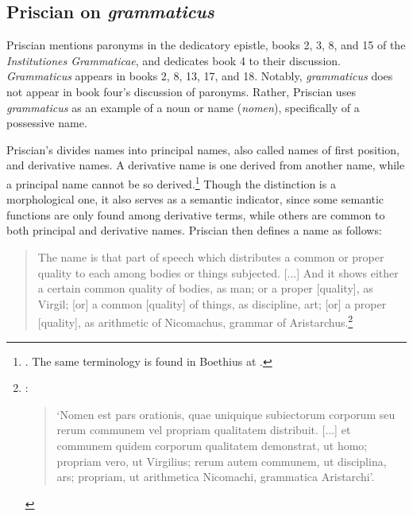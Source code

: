 \documentclass[]{article}
\begin{document}
\subsection{Priscian on \textit{grammaticus}}
Priscian mentions paronyms in the dedicatory epistle, books 2, 3, 8, and 15 of the \textit{Institutiones Grammaticae}, and dedicates book 4 to their discussion. \textit{Grammaticus} appears in books 2, 8, 13, 17, and 18. Notably, \textit{grammaticus} does not appear in book four's discussion of paronyms. Rather, Priscian uses \textit{grammaticus} as an example of a noun or name (\textit{nomen}), specifically of a possessive name.

Priscian's divides names into principal names, also called names of first position, and derivative names. A derivative name is one derived from another name, while a principal name cannot be so derived.\footnote{\cite[\textit{inst. gram.} II, pp. 59-60]{inst.gram.}. The same terminology is found in Boethius at \cite[BC 168A]{BC}.} Though the distinction is a morphological one, it also serves as a semantic indicator, since some semantic functions are only found among derivative terms, while others are common to both principal and derivative names. Priscian then defines a name as follows:
\begin{quote}
The name is that part of speech which distributes a common or proper quality to each among bodies or things subjected. [...] And it shows either a certain common quality of bodies, as man; or a proper [quality], as Virgil; [or] a common [quality] of things, as discipline, art; [or] a proper [quality], as arithmetic of Nicomachus, grammar of Aristarchus.\footnote{\cite[\textit{inst. gram.}, II, pp. 56-57]{inst.gram.}:
\begin{quote}
`Nomen est pars orationis, quae uniquique subiectorum corporum seu rerum communem vel propriam qualitatem distribuit. [...] et communem quidem corporum qualitatem demonstrat, ut homo; propriam vero, ut Virgilius; rerum autem communem, ut disciplina, ars; propriam, ut arithmetica Nicomachi, grammatica Aristarchi'.
\end{quote}}
\end{quote}
\end{document}

